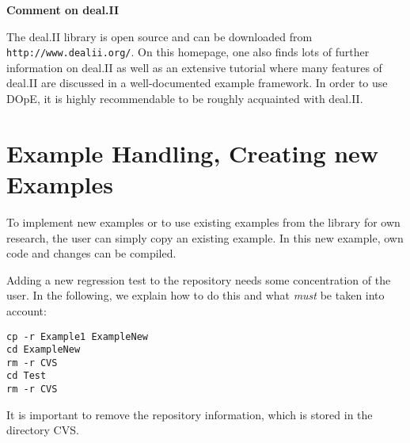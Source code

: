 \documentclass[a4paper,cleardoubleempty]{scrreprt}
\begin{document}
{\bf Comment on deal.II}

The deal.II library is open
source and can be downloaded from \texttt{http://www.dealii.org/}. On this
homepage, one also finds lots of further information on deal.II as well as
an extensive tutorial where many features of deal.II are discussed in a
well-documented example framework. In order to use DOpE, it is highly
recommendable to be roughly acquainted with deal.II.



\cleardoublepage

\chapter{Example Handling, Creating new Examples}
To implement new examples or to use existing examples 
from the library for own research, the user 
can simply copy an existing example. In this 
new example, own code and changes can be compiled.

Adding a new regression test to the repository 
needs some concentration of the user. In the 
following, we explain how to do this and what 
\textit{must} be taken into account:
\begin{verbatim}
cp -r Example1 ExampleNew
cd ExampleNew
rm -r CVS
cd Test
rm -r CVS
\end{verbatim}
It is important to remove the repository information,
which is stored in the directory CVS.
\end{document}

